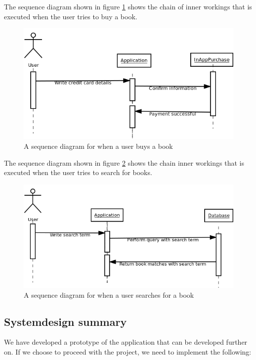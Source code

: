 \documentclass[12pt]{article}
\begin{document}
The sequence diagram shown in figure \ref{SeqDiaBuyBook} shows the chain of inner workings that is executed when the user tries to buy a book.
\begin{figure}[H]
\includegraphics[scale=0.6]{SequenceDiagramBuyBook.png}
\caption{A sequence diagram for when a user buys a book}
\label{SeqDiaBuyBook}
\end{figure}

The sequence diagram shown in figure \ref{SeqDiaBookSearch} shows the chain inner workings that is executed when the user tries to search for books.
\begin{figure}[H]
\includegraphics[scale=0.6]{SequenceDiagramBookSearch.png}
\caption{A sequence diagram for when a user searches for a book}
\label{SeqDiaBookSearch}
\end{figure}

\subsection{Systemdesign summary}
\label{sec:Syssum}
We have developed a prototype of the application that can be developed further on. If we choose to proceed with the project, we need to implement the following:\\
\end{document}
